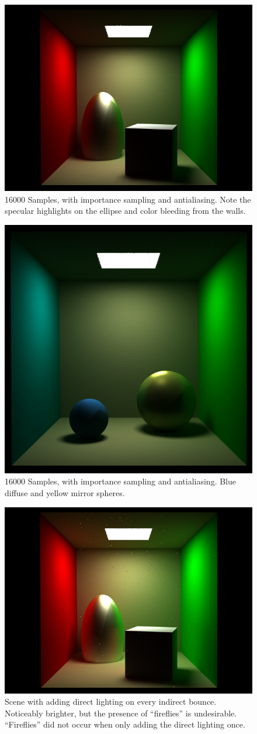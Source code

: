 \documentclass[11pt]{article}
\begin{document}
\begin{figure}
	\begin{center}
		\includegraphics[width=.5\linewidth]{figs/specular_ellipse_1000samples}
		\caption{16000 Samples, with importance sampling and antialiasing. Note the specular highlights
		on the ellipse and color bleeding from the walls.}
	\end{center}
\end{figure}
\begin{figure}
	\begin{center}
		\includegraphics[width=.5\linewidth]{figs/2spheres_1000samples}
		\caption{16000 Samples, with importance sampling and antialiasing. Blue diffuse and yellow mirror spheres.}
	\end{center}
\end{figure}
\begin{figure}
\begin{center}
\includegraphics[width=.5\linewidth]{figs/cornell_everything_1000}
\caption{Scene with adding direct lighting on every indirect bounce. Noticeably brighter, but the presence of ``fireflies'' is undesirable. ``Fireflies'' did not occur when only adding the direct lighting once.}
\end{center}

\end{figure}
\end{document}
